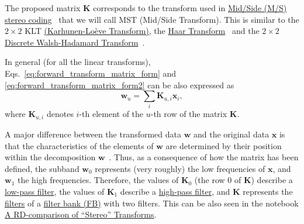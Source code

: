 The proposed matrix ${\mathbf K}$ corresponds to the transform used in
\href{https://en.wikipedia.org/wiki/Joint_encoding#M/S_stereo_coding}{Mid/Side
  (M/S) stereo coding}~\cite{bosi2003intro} that we will call MST
(Mid/Side Transform). This is similar to the $2\times 2$ KLT
\href{https://en.wikipedia.org/wiki/Kosambi%E2%80%93Karhunen%E2%80%93Lo%C3%A8ve_theorem}{(Karhunen-Lo\`eve
  Transform)}, the
\href{http://wavelets.pybytes.com/wavelet/haar/}{Haar
  Transform}~\cite{vetterli1995wavelets} and the $2\times 2$
\href{https://en.wikipedia.org/wiki/Hadamard_transform}{Discrete
  Walsh-Hadamard Transform}~\cite{sayood2017introduction}.

In general (for all the linear transforms),
Eqs.~\eqref{eq:forward_transform_matrix_form} and
\eqref{eq:forward_transform_matrix_form2} can be also expressed as
\begin{equation}
  {\mathbf w}_u = \sum_i {\mathbf K}_{u,i}{\mathbf x}_i,
  \label{eq:forward_transform_linear_combination_form}
\end{equation}
where ${\mathbf K}_{u,i}$ denotes $i$-th element of the $u$-th row of
the matrix ${\mathbf K}$.

A major difference between the transformed data ${\mathbf w}$ and the
original data ${\mathbf x}$ is that the characteristics of the
elements of ${\mathbf w}$ are determined by their position within the
decomposition ${\mathbf w}$~\cite{sayood2017introduction}. Thus, as a
consequence of how the matrix has been defined, the subband ${\mathbf
  w}_0$ represents (very roughly) the low frequencies of ${\mathbf
  x}$, and ${\mathbf w}_1$ the high frequencies. Therefore, the values
of ${\mathbf K}_0$ (the row 0 of ${\mathbf K}$) describe a
\href{https://en.wikipedia.org/wiki/Low-pass_filter}{low-pass filter},
the values of ${\mathbf K}_1$ describe a
\href{https://en.wikipedia.org/wiki/High-pass_filter}{high-pass
  filter}, and ${\mathbf K}$ represents the
\href{https://en.wikipedia.org/wiki/Digital_filter}{filters} of a
\href{https://en.wikipedia.org/wiki/Filter_bank}{filter bank (FB)} with two
filters. This can be also seen in the notebook
\href{https://github.com/Tecnologias-multimedia/Tecnologias-multimedia.github.io/blob/master/study_guide/transform_coding/stereo_transforms_RD.ipynb}{A RD-comparison of ``Stereo'' Transforms}.

